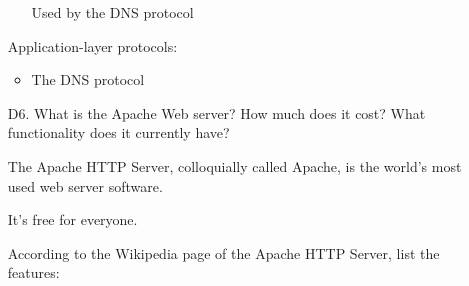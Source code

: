 \begin{enumerate}
\begin{itemize}
        Used by the DNS protocol
    \end{itemize}
    
    Application-layer protocols:
    
    \begin{itemize}
        \item The DNS protocol
    \end{itemize}
    
    \item[D6.] What is the Apache Web server? How much does it cost? What functionality does it currently have?
    
    The Apache HTTP Server, colloquially called Apache, is the world's most used web server software.
    
    It's free for everyone.
    
    According to the Wikipedia page of the Apache HTTP Server, list the features:
    

\end{enumerate}
